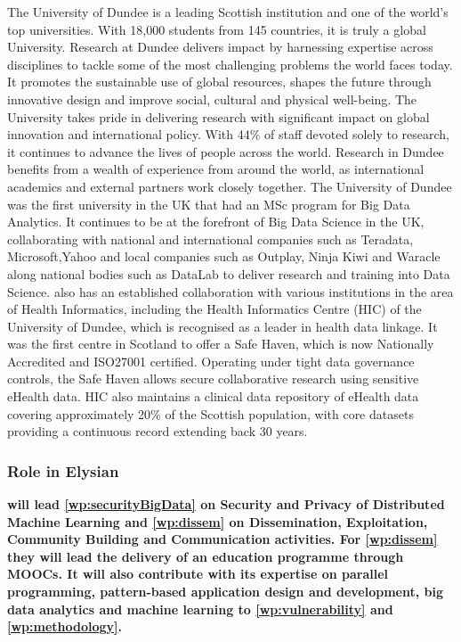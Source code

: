 \documentclass[a4paper,11pt]{article}
\begin{document}
The University of Dundee is a leading Scottish institution and one of the world’s top universities. With 18,000 students from 145 countries, it is truly a global University. Research at Dundee delivers impact by harnessing expertise across disciplines to tackle some of the most challenging problems the world faces today. It promotes the sustainable use of global resources, shapes the future through innovative design and improve social, cultural and physical well-being. The University takes pride in delivering research with significant impact on global innovation and international policy. With 44\% of staff devoted solely to research, it continues to advance the lives of people across the world. Research in Dundee benefits from a wealth of experience from around the world, as international academics and external partners work closely together.
The University of Dundee was the first university in the UK that had an MSc program for Big Data Analytics. It continues to be at the forefront of Big Data Science in the UK, collaborating with national and international companies such as Teradata, Microsoft,Yahoo and local companies such as Outplay, Ninja Kiwi and Waracle along national bodies such as DataLab to deliver research and training into Data Science. \UODshort{} also has an established collaboration with various institutions in the area of Health Informatics, including the Health Informatics Centre (HIC) of the University of Dundee, which is recognised as a leader in health data linkage. It was the first centre in Scotland to offer a Safe Haven, which is now Nationally Accredited and ISO27001 certified. Operating under tight data governance controls, the Safe Haven allows secure collaborative research using sensitive eHealth data. HIC also maintains a clinical data repository of eHealth data covering approximately 20\% of the Scottish population, with core datasets providing a continuous record extending back 30 years.


\subsubsection*{Role in Elysian}
\textbf{\UODshort{} will lead \ref{wp:securityBigData} on Security and Privacy of Distributed Machine Learning
and \ref{wp:dissem} on Dissemination, Exploitation, Community Building and Communication activities. For \ref{wp:dissem} they will lead the delivery of an education programme through MOOCs. It will also contribute with its expertise on parallel programming, pattern-based application design and development, big data analytics and machine learning to \ref{wp:vulnerability} and \ref{wp:methodology}.}  
\end{document}
